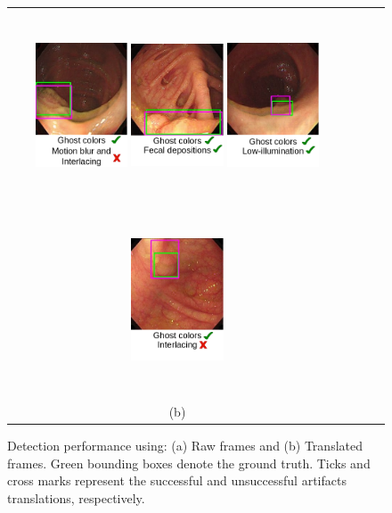\documentclass[letterpaper]{article} %
\begin{document}
\begin{figure}
{\begin{tabular}{cccc}
          \includegraphics[width=0.28\textwidth,height=160pt]{dia1.png}  \hfill
          \includegraphics[width=0.28\textwidth,height=160pt]{dia2.png}  \hfill
          \includegraphics[width=0.28\textwidth,height=160pt]{dia3.png} \hfill
          \includegraphics[width=0.28\textwidth,height=160pt]{dia4.png} \\
           (b)
        

           
    \end{tabular}
    }
     \caption{ Detection performance using: (a) Raw frames and (b) Translated frames. Green bounding boxes denote the ground truth. Ticks and cross marks represent the successful and unsuccessful artifacts translations, respectively.
     }
      \label{fig:sample_res}
      
\end{figure}
\end{document}
